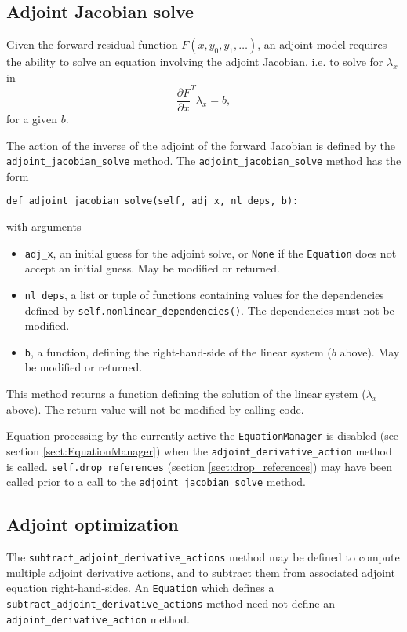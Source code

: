 \documentclass[11pt]{article}
\begin{document}
\subsection{Adjoint Jacobian solve}

Given the forward residual function $F \left( x, y_0, y_1, \ldots \right)$, an
adjoint model requires the ability to solve an equation involving the adjoint
Jacobian, i.e. to solve for $\lambda_x$ in
\begin{equation*}
  \frac{\partial F}{\partial x}^T \lambda_x = b,
\end{equation*}
for a given $b$.

The action of the inverse of the adjoint of the forward Jacobian is defined by
the \texttt{adjoint\_jacobian\_solve} method. The
\texttt{adjoint\_jacobian\_solve} method has the form
\begin{lstlisting}
def adjoint_jacobian_solve(self, adj_x, nl_deps, b):
\end{lstlisting}
with arguments
\begin{itemize}
  \item \texttt{adj\_x}, an initial guess for the adjoint solve, or
    \texttt{None} if the \texttt{Equation} does not accept an initial guess.
    May be modified or returned.
  \item \texttt{nl\_deps}, a list or tuple of functions containing values for
    the dependencies defined by \texttt{self.nonlinear\_dependencies()}. The
    dependencies must not be modified.
  \item \texttt{b}, a function, defining the right-hand-side of the linear
    system ($b$ above). May be modified or returned.
\end{itemize}
This method returns a function defining the solution of the linear system
($\lambda_x$ above). The return value will not be modified by calling code.

Equation processing by the currently active the \texttt{EquationManager} is
disabled (see section \ref{sect:EquationManager}) when the
\texttt{adjoint\_derivative\_action} method is called.
\texttt{self.drop\_references} (section \ref{sect:drop_references}) may have
been called prior to a call to the \texttt{adjoint\_jacobian\_solve} method.

\subsection{Adjoint optimization}

The \texttt{subtract\_adjoint\_derivative\_actions} method may be defined to
compute multiple adjoint derivative actions, and to subtract them from
associated adjoint equation right-hand-sides. An \texttt{Equation} which
defines a \texttt{subtract\_adjoint\_derivative\_actions} method need not
define an \texttt{adjoint\_derivative\_action} method.
\end{document}
